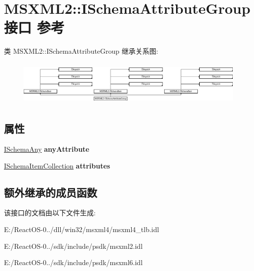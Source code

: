 \hypertarget{interface_m_s_x_m_l2_1_1_i_schema_attribute_group}{}\section{M\+S\+X\+M\+L2\+:\+:I\+Schema\+Attribute\+Group接口 参考}
\label{interface_m_s_x_m_l2_1_1_i_schema_attribute_group}
类 M\+S\+X\+M\+L2\+:\+:I\+Schema\+Attribute\+Group 继承关系图\+:\begin{figure}[H]
\begin{center}
\leavevmode
\includegraphics[height=2.232855cm]{interface_m_s_x_m_l2_1_1_i_schema_attribute_group}
\end{center}
\end{figure}
\subsection*{属性}
\begin{DoxyCompactItemize}
\item 
\mbox{\label{interface_m_s_x_m_l2_1_1_i_schema_attribute_group_a32063fb8c045471797f249f65426f62c}} 
\hyperlink{interface_m_s_x_m_l2_1_1_i_schema_any}{I\+Schema\+Any} {\bfseries any\+Attribute}
\item 
\mbox{\label{interface_m_s_x_m_l2_1_1_i_schema_attribute_group_a7ce8f822e1606b9d180ad07200a669c4}} 
\hyperlink{interface_m_s_x_m_l2_1_1_i_schema_item_collection}{I\+Schema\+Item\+Collection} {\bfseries attributes}
\end{DoxyCompactItemize}
\subsection*{额外继承的成员函数}


该接口的文档由以下文件生成\+:\begin{DoxyCompactItemize}
\item 
E\+:/\+React\+O\+S-\/0../dll/win32/msxml4/msxml4\+\_\+tlb.\+idl\item 
E\+:/\+React\+O\+S-\/0../sdk/include/psdk/msxml2.\+idl\item 
E\+:/\+React\+O\+S-\/0../sdk/include/psdk/msxml6.\+idl\end{DoxyCompactItemize}

